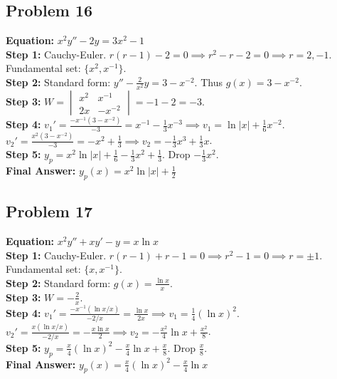 \documentclass[11pt]{article}
\begin{document}
\subsection*{Problem 16}
\textbf{Equation:} $x^2 y'' - 2y = 3x^2 - 1$ \\
\textbf{Step 1:} Cauchy-Euler. $r(r-1) - 2 = 0 \implies r^2 - r - 2 = 0 \implies r = 2, -1$. Fundamental set: $\{x^2, x^{-1}\}$. \\
\textbf{Step 2:} Standard form: $y'' - \frac{2}{x^2}y = 3 - x^{-2}$. Thus $g(x) = 3 - x^{-2}$. \\
\textbf{Step 3:} $W = \begin{vmatrix} x^2 & x^{-1} \\ 2x & -x^{-2} \end{vmatrix} = -1 - 2 = -3$. \\
\textbf{Step 4:} $v_1' = \frac{-x^{-1}(3 - x^{-2})}{-3} = x^{-1} - \frac{1}{3}x^{-3} \implies v_1 = \ln|x| + \frac{1}{6}x^{-2}$. \\
$v_2' = \frac{x^2(3 - x^{-2})}{-3} = -x^2 + \frac{1}{3} \implies v_2 = -\frac{1}{3}x^3 + \frac{1}{3}x$. \\
\textbf{Step 5:} $y_p = x^2\ln|x| + \frac{1}{6} - \frac{1}{3}x^2 + \frac{1}{3}$. Drop $-\frac{1}{3}x^2$. \\
\textbf{Final Answer:} $y_p(x) = x^2\ln|x| + \frac{1}{2}$

\subsection*{Problem 17}
\textbf{Equation:} $x^2 y'' + xy' - y = x \ln x$ \\
\textbf{Step 1:} Cauchy-Euler. $r(r-1) + r - 1 = 0 \implies r^2 - 1 = 0 \implies r = \pm 1$. Fundamental set: $\{x, x^{-1}\}$. \\
\textbf{Step 2:} Standard form: $g(x) = \frac{\ln x}{x}$. \\
\textbf{Step 3:} $W = -\frac{2}{x}$. \\
\textbf{Step 4:} $v_1' = \frac{-x^{-1}(\ln x / x)}{-2/x} = \frac{\ln x}{2x} \implies v_1 = \frac{1}{4}(\ln x)^2$. \\
$v_2' = \frac{x(\ln x / x)}{-2/x} = -\frac{x\ln x}{2} \implies v_2 = -\frac{x^2}{4}\ln x + \frac{x^2}{8}$. \\
\textbf{Step 5:} $y_p = \frac{x}{4}(\ln x)^2 - \frac{x}{4}\ln x + \frac{x}{8}$. Drop $\frac{x}{8}$. \\
\textbf{Final Answer:} $y_p(x) = \frac{x}{4}(\ln x)^2 - \frac{x}{4}\ln x$
\end{document}
